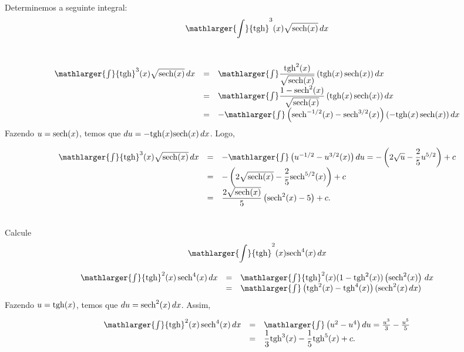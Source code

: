 \cleardoublepage\documentclass[../main.tex]{subfiles}
\begin{document}
\begin{ex}~
\\ Determinemos a seguinte integral: \[ \mathlarger{\int}{\rm tgh}^3( x) \sqrt{{\rm sech}(x)}\,dx\]\\

\begin{solution}
\[ \begin{array}{rcl} \mathlarger{\int}{\rm tgh}^3 (x) \sqrt{{\rm sech}(x)}\,dx &=&\mathlarger{\int}\dfrac{{\rm tgh}^2( x)}{\sqrt{{\rm sech}(x)}}\left({\rm tgh}( x)\, {\rm sech}(x)\right)dx\\ &=&\mathlarger{\int}\dfrac{1- {\rm sech}^2( x)}{\sqrt{{\rm sech}(x)}}\left({\rm tgh}( x)\, {\rm sech}(x)\right)dx\\ &=&-\mathlarger{\int} \left({\rm sech}^{-1/2}( x) - {\rm sech}^{3/2}( x)\right) \left(-{\rm tgh}( x)\, {\rm sech}(x)\right)dx\\ \end{array} \]
Fazendo \(u={\rm sech}(x) \), temos que \( du=-{\rm tgh}(x){\rm sech}(x)\,dx \). Logo,

\[ \begin{array}{rcl} \mathlarger{\int}{\rm tgh}^3 (x) \sqrt{{\rm sech}(x)}\,dx &=&-\mathlarger{\int} \left(u^{-1/2} - u^{3/2}( x)\right) du= - \left(2 \sqrt{u}-\dfrac{2}{5} u^{5/2} \right)+c\\ &=& - \left(2 \sqrt{{\rm sech}(x)}-\dfrac{2}{5} {\rm sech}^{5/2}( x) \right)+c\\ &=& \dfrac{2\sqrt{{\rm sech}(x)}}{5}\left({\rm sech}^{2} (x) -5\right)+c. \end{array} \]
\end{solution}
\end{ex}

\begin{ex}~
\\Calcule
\[ \mathlarger{\int} {\rm tgh}^2(x) {\rm sech}^{4}(x)\, dx\]

\begin{solution}
\[ \begin{array}{rcl} \mathlarger{\int} {\rm tgh}^2(x) \,{\rm sech}^{4}(x)\, dx &=& \mathlarger{\int} {\rm tgh}^2( x)(1-{\rm tgh}^2( x))\left( {\rm sech}^2( x)\right)\, dx\\ &=& \mathlarger{\int} \left({\rm tgh}^2 (x) -{\rm tgh}^4 (x)\right)( {\rm sech}^2 (x)\, dx)\\ \end{array} \]
Fazendo \( u={\rm tgh}(x)\), temos que \( du={\rm sech}^2(x)\,dx \). Assim,

\[ \begin{array}{rcl} \mathlarger{\int} {\rm tgh}^2(x) \,{\rm sech}^{4}(x)\, dx &=& \mathlarger{\int} \left(u^2 -u^4\right)du=\frac{u^3}{3}-\frac{u^5}{5}\\ &=&\dfrac{1}{3}{\rm tgh}^3( x) -\dfrac{1}{5}{\rm tgh}^5( x)+c. \end{array} \]

\end{solution}
\end{ex}
\end{document}
